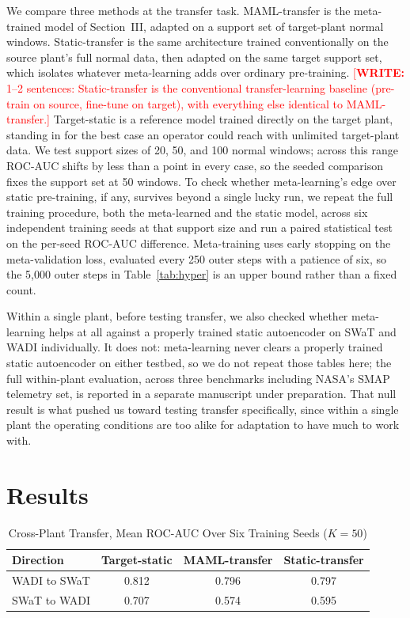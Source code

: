 \documentclass[conference]{IEEEtran}
\newcommand{\authorwrite}[1]{\textcolor{red}{[\textbf{WRITE:} #1]}}
\begin{document}
We compare three methods at the transfer task. MAML-transfer is the
meta-trained model of Section~III, adapted on a support set of target-plant
normal windows. Static-transfer is the same architecture trained
conventionally on the source plant's full normal data, then adapted on the
same target support set, which isolates whatever meta-learning adds over
ordinary pre-training.
\authorwrite{1--2 sentences: Static-transfer is the conventional transfer-learning baseline (pre-train on source, fine-tune on target), with everything else identical to MAML-transfer.}
Target-static is a reference model trained directly on the target plant,
standing in for the best case an operator could reach with unlimited
target-plant data. We test support sizes of 20, 50, and 100 normal windows;
across this range ROC-AUC shifts by less than a point in every case, so the
seeded comparison fixes the support set at 50 windows. To check whether
meta-learning's edge over static pre-training, if any, survives beyond a
single lucky run, we repeat the full training procedure, both the
meta-learned and the static model, across six independent training seeds at
that support size and run a paired statistical test on the per-seed ROC-AUC
difference. Meta-training uses early stopping on the meta-validation loss,
evaluated every 250 outer steps with a patience of six, so the 5,000 outer
steps in Table~\ref{tab:hyper} is an upper bound rather than a fixed count.

Within a single plant, before testing transfer, we also checked whether
meta-learning helps at all against a properly trained static autoencoder on
SWaT and WADI individually. It does not: meta-learning never clears a
properly trained static autoencoder on either testbed, so we do not repeat
those tables here; the full within-plant evaluation, across three benchmarks
including NASA's SMAP telemetry set, is reported in a separate manuscript
under preparation. That null result is what pushed us toward testing
transfer specifically, since within a single plant the operating conditions
are too alike for adaptation to have much to work with.

\section{Results}

\begin{table}[t]
\caption{Cross-Plant Transfer, Mean ROC-AUC Over Six Training Seeds
($K=50$)}
\label{tab:results}
\centering
\footnotesize
\begin{tabular}{@{}lccc@{}}
\toprule
Direction & Target-static & MAML-transfer & Static-transfer \\
\midrule
WADI to SWaT & 0.812 & 0.796 & 0.797 \\
SWaT to WADI & 0.707 & 0.574 & 0.595 \\
\bottomrule
\end{tabular}
\end{table}
\end{document}
